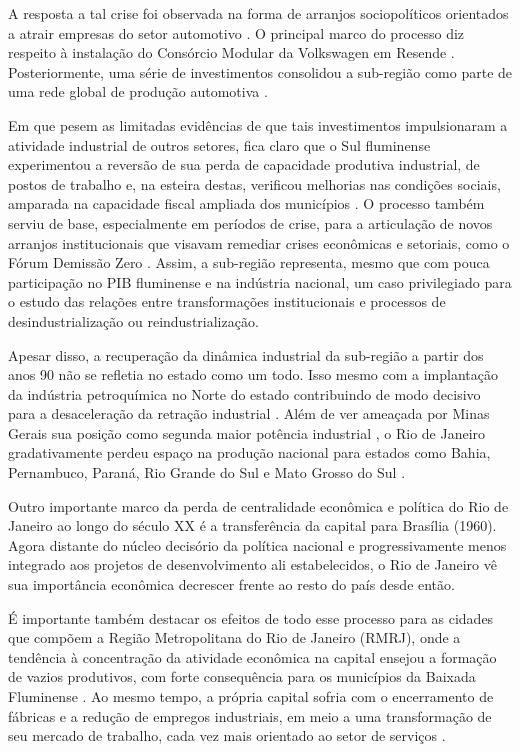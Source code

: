 A resposta a tal crise foi observada na forma de arranjos sociopolíticos
orientados a atrair empresas do setor automotivo
\citep{ramalho2015,rodrigues_o_2007}. O principal marco do processo diz respeito à instalação
do Consórcio Modular da Volkswagen em Resende
\citep{abreubeynonramalho2000}. Posteriormente, uma série de investimentos consolidou a
sub-região como parte de uma rede global de produção automotiva
\citep{santos2021}.

Em que pesem as limitadas evidências de que tais investimentos
impulsionaram a atividade industrial de outros setores, fica claro que o
Sul fluminense experimentou a reversão de sua perda de capacidade
produtiva industrial, de postos de trabalho e, na esteira destas,
verificou melhorias nas condições sociais, amparada na capacidade fiscal
ampliada dos municípios
\citep{ramalho2015}. O
processo também serviu de base, especialmente em períodos de crise, para
a articulação de novos arranjos institucionais que visavam remediar
crises econômicas e setoriais, como o Fórum Demissão Zero
\citep{ramalho2005}.
Assim, a sub-região representa, mesmo que com pouca participação no PIB
fluminense e na indústria nacional, um caso privilegiado para o estudo
das relações entre transformações institucionais e processos de
desindustrialização ou reindustrialização.

Apesar disso, a recuperação da dinâmica industrial da sub-região a
partir dos anos 90 não se refletia no estado como um todo. Isso mesmo
com a implantação da indústria petroquímica no Norte do estado
contribuindo de modo decisivo para a desaceleração da retração
industrial \citep{piquet2021}. Além de ver ameaçada por Minas Gerais sua posição como segunda
maior potência industrial
\citep{cni2021}, o Rio de
Janeiro gradativamente perdeu espaço na produção nacional para estados
como Bahia, Pernambuco, Paraná, Rio Grande do Sul e Mato Grosso do Sul
\citep{cni2021}.

Outro importante marco da perda de centralidade econômica e política do
Rio de Janeiro ao longo do século XX é a transferência da capital para
Brasília (1960). Agora distante do núcleo decisório da política nacional
e progressivamente menos integrado aos projetos de desenvolvimento ali
estabelecidos, o Rio de Janeiro vê sua importância econômica decrescer
frente ao resto do país desde então.

É importante também destacar os efeitos de todo esse processo para as
cidades que compõem a Região Metropolitana do Rio de Janeiro (RMRJ),
onde a tendência à concentração da atividade econômica na capital
ensejou a formação de vazios produtivos, com forte consequência para os
municípios da Baixada Fluminense
\citep{sobral2016,sobral2017}.
Ao mesmo tempo, a própria capital sofria com o encerramento de fábricas
e a redução de empregos industriais, em meio a uma transformação de seu
mercado de trabalho, cada vez mais orientado ao setor de serviços .

